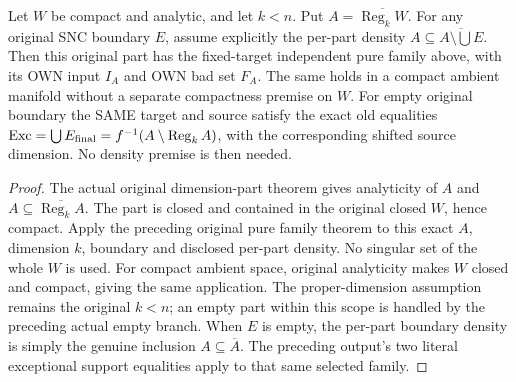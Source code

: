 \begin{theorem}
\label{hir:original-dimension-part-own-compact-canonical-family}
\leanok
Let $W$ be compact and analytic, and let $k<n$. Put
$A=\overline{\operatorname{Reg}_k W}$. For any original SNC boundary
$E$, assume explicitly the per-part density
$A\subseteq\overline{A\setminus\bigcup E}$.
Then this original part has the fixed-target independent pure family
above, with its OWN input $I_A$ and OWN bad set $F_A$.
The same holds in a compact ambient manifold without a separate
compactness premise on $W$.
For empty original boundary the SAME target and source satisfy
the exact old equalities $\operatorname{Exc}=\bigcup E_{\rm final}
=f^{-1}(A\setminus\operatorname{Reg}_k A)$, with the corresponding
shifted source dimension. No density premise is then needed.
\end{theorem}
\begin{proof}
The actual original dimension-part theorem gives analyticity of $A$
and $A\subseteq\overline{\operatorname{Reg}_k A}$. The part is closed
and contained in the original closed $W$, hence compact. Apply the
preceding original pure family theorem to this exact $A$, dimension
$k$, boundary and disclosed per-part density. No singular set of the
whole $W$ is used. For compact ambient space, original analyticity
makes $W$ closed and compact, giving the same application. The
proper-dimension assumption remains the original $k<n$; an empty
part within this scope is handled by the preceding actual empty branch.
When $E$ is empty, the per-part boundary density is simply the genuine
inclusion $A\subseteq\overline A$. The preceding output's two literal
exceptional support equalities apply to that same selected family.
\end{proof}

